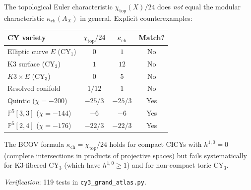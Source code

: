 \documentclass[11pt]{article}
\newcommand{\bP}{\mathbb{P}}
\newcommand{\CY}{\mathrm{CY}}
\begin{document}
\begin{theorem}
\label{wn:thm:chi-neq-kappa}
The topological Euler characteristic $\chi_{\mathrm{top}}(X)/24$ does \emph{not} equal the modular characteristic $\kappa_{\mathrm{ch}}(A_X)$ in general. Explicit counterexamples:
\begin{center}
\renewcommand{\arraystretch}{1.2}
\begin{tabular}{lccc}
 \toprule
 \textbf{CY variety} & $\chi_{\mathrm{top}}/24$ & $\kappa_{\mathrm{ch}}$ & \textbf{Match?} \\
 \midrule
 Elliptic curve $E$ ($\CY_1$) & $0$ & $1$ & No \\
 K3 surface ($\CY_2$) & $1$ & $12$ & No \\
 $K3 \times E$ ($\CY_3$) & $0$ & $5$ & No \\
 Resolved conifold & $1/12$ & $1$ & No \\
 \midrule
 Quintic ($\chi = -200$) & $-25/3$ & $-25/3$ & Yes \\
 $\bP^5[3,3]$ ($\chi = -144$) & $-6$ & $-6$ & Yes \\
 $\bP^5[2,4]$ ($\chi = -176$) & $-22/3$ & $-22/3$ & Yes \\
 \bottomrule
\end{tabular}
\end{center}
The BCOV formula $\kappa_{\mathrm{ch}} = \chi_{\mathrm{top}}/24$ holds for compact CICYs with $h^{1,0} = 0$ (complete intersections in products of projective spaces) but fails systematically for K3-fibered CY$_3$ (which have $h^{1,0} \geq 1$) and for non-compact toric CY$_3$.

\noindent\textit{Verification}: 119 tests in \texttt{cy3\_grand\_atlas.py}.
\end{theorem}
\end{document}
